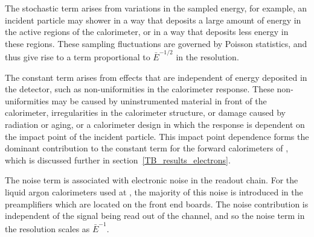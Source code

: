 The stochastic term arises from variations in the sampled energy, for example, an incident particle may shower in a way that deposits a large amount of energy in the active regions of the calorimeter, or in a way that deposits less energy in these regions. These sampling fluctuations are governed by Poisson statistics, and thus give rise to a term proportional to $\bar{E}^{-1/2}$ in the resolution\cite{fabiola_calorimetry}.

The constant term arises from effects that are independent of energy deposited in the detector, such as non-uniformities in the calorimeter response. These non-uniformities may be caused by uninstrumented material in front of the calorimeter, irregularities in the calorimeter structure, or damage caused by radiation or aging, or a calorimeter design in which the response is dependent on the impact point of the incident particle. This impact point dependence forms the dominant contribution to the constant term for the forward calorimeters of \atlas, which is discussed further in section~\ref{TB_results_electrons}.

The noise term is associated with electronic noise in the readout chain. For the liquid argon calorimeters used at \atlas, the majority of this noise is introduced in the preamplifiers which are located on the front end boards. The noise contribution is independent of the signal being read out of the channel, and so the noise term in the resolution scales as $\bar{E}^{-1}$.


%
%
%
%
%
%
%
%
%

